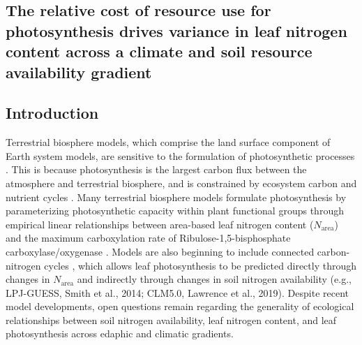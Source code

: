 \begin{singlespace}
    \chapter{\textbf{The relative cost of resource use for photosynthesis drives variance in leaf nitrogen content across a climate and soil resource availability gradient}}
\end{singlespace}

\section{Introduction}
\noindent Terrestrial biosphere models, which comprise the land surface component of Earth system models, are sensitive to the formulation of photosynthetic processes . This is because photosynthesis is the largest carbon flux between the atmosphere and terrestrial biosphere, and is constrained by ecosystem carbon and nutrient cycles . Many terrestrial biosphere models formulate photosynthesis by parameterizing photosynthetic capacity within plant functional groups through empirical linear relationships between area-based leaf nitrogen content ($N_\mathrm{area}$) and the maximum carboxylation rate of Ribulose-1,5-bisphosphate carboxylase/oxygenase . Models are also beginning to include connected carbon-nitrogen cycles , which allows leaf photosynthesis to be predicted directly through changes in $N_{\mathrm{area}}$ and indirectly through changes in soil nitrogen availability (e.g., LPJ-GUESS, Smith et al., 2014; CLM5.0, Lawrence et al., 2019). Despite recent model developments, open questions remain regarding the generality of ecological relationships between soil nitrogen availability, leaf nitrogen content, and leaf photosynthesis across edaphic and climatic gradients.

